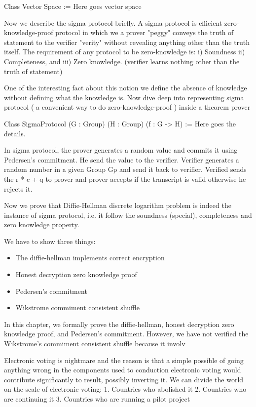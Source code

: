   Class Vector Space := 
   Here goes vector space
   
   
 Now we describe the sigma protocol briefly. A sigma protocol is efficient 
 zero-knowledge-proof protocol in which we a prover "peggy" conveys the truth of 
 statement to the verifier "verity" without revealing anything other than the truth itself. 
 The requirement of any protocol to be zero-knowledge is: i) Soundness 
 ii) Completeness, and iii) Zero knowledge. (verifier learns nothing other than 
 the truth of statement)
 
 One of the interesting fact about this notion we define the absence of knowledge without 
 defining what the knowledge is. Now dive deep into representing sigma protocol ( a convenient way 
 to do zero-knowledge-proof ) inside a theorem prover 
   
   Class SigmaProtocol (G : Group) (H : Group) (f : G -> H) := 
   Here goes the details. 
   
   
   In sigma protocol, the prover generates a random value and commits it using Pedersen's commitment. 
   He send the value to the verifier. Verifier generates a random number in a given Group Gp and 
   send it back to verifier. Verified sends the  r * c + q to prover and prover accepts if the transcript is 
   valid otherwise he rejects it. 
   
   
   Now we prove that Diffie-Hellman discrete logarithm problem is indeed the instance 
   of sigma protocol, i.e. it follow the soundness (special), completeness and zero knowledge 
   property. 
   
   We have to show three things:
   \begin{itemize}
   \item The diffie-hellman implements correct encryption 
   \item Honest decryption zero knowledge proof
   \item Pedersen's commitment 
   \item Wikstrome commiment consistent shuffle 
   \end{itemize}
   
   In this chapter, we formally prove the diffie-hellman, honest decryption zero knowledge proof, 
   and Pedersen's commitment. However, we have not verified the Wikstrome's commiment 
   consistent shuffle because it involv
   
   
   
   

 Electronic voting is nightmare and the reason is that a simple possible of 
 going anything wrong in the components used to conduction electronic 
 voting would contribute significantly to result, possibly inverting it. 
 We can divide the world on the scale of electronic voting:
 1. Countries who abolished it
 2. Countries who are continuing it
 3. Countries who are running a pilot project 
 
